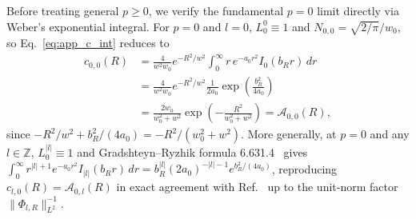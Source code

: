 \documentclass[aps,pra,onecolumn,notitlepage,11pt,tightenlines,amsmath,amssymb,floatfix,longbibliography]{revtex4-2}
\providecommand{\abs}[1]{\lvert#1\rvert}
\providecommand{\norm}[1]{\lVert#1\rVert}
\begin{document}
Before treating general $p \ge 0$, we verify the fundamental $p = 0$ limit directly via Weber's exponential integral. For $p = 0$ and $l = 0$, $L_0^0 \equiv 1$ and $N_{0,0} = \sqrt{2/\pi}/w_0$, so Eq.~\eqref{eq:app_c_int} reduces to
\begin{align}
c_{0,0}(R) &= \frac{4}{w^2 w_0} e^{-R^2/w^2} \int_0^\infty r\,e^{-a_0 r^2} I_0(b_R r)\,dr \nonumber \\
&= \frac{4}{w^2 w_0} e^{-R^2/w^2} \frac{1}{2a_0} \exp\!\left(\frac{b_R^2}{4a_0}\right) \nonumber \\
&= \frac{2w_0}{w_0^2 + w^2} \exp\!\left(-\frac{R^2}{w_0^2 + w^2}\right) = \mathcal{A}_{0,0}(R),
\label{eq:app_p0_l0_check}
\end{align}
since $-R^2/w^2 + b_R^2/(4a_0) = -R^2/(w_0^2 + w^2)$. More generally, at $p = 0$ and any $l \in \mathbb{Z}$, $L_0^{\abs{l}} \equiv 1$ and Gradshteyn--Ryzhik formula 6.631.4~\cite{Gradshteyn2014} gives $\int_0^\infty r^{\abs{l}+1} e^{-a_0 r^2} I_{\abs{l}}(b_R r)\,dr = b_R^{\abs{l}} (2 a_0)^{-\abs{l}-1} e^{b_R^2/(4a_0)}$, reproducing $c_{l,0}(R) = \mathcal{A}_{0,l}(R)$ in exact agreement with Ref.~\cite{Ferreira2026} up to the unit-norm factor $\norm{\Phi_{l,R}}_{L^2}^{-1}$.
\end{document}
